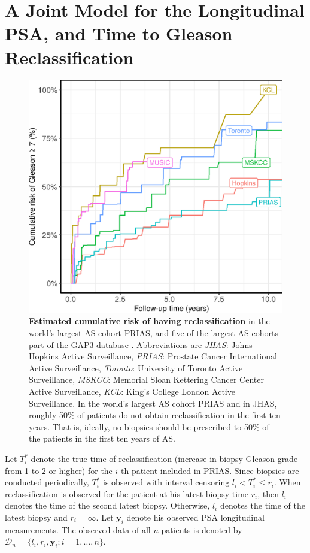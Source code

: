 \section{A Joint Model for the Longitudinal PSA, and Time to Gleason Reclassification}
\label{sec:jm_framework}

\begin{figure}
\centerline{\includegraphics[width=\columnwidth]{images/npmle_plot.eps}}
\caption{\textbf{Estimated cumulative risk of having reclassification} in the world's largest AS cohort PRIAS, and five of the largest AS cohorts part of the GAP3 database \citep{gap3_2018}. Abbreviations are \textit{JHAS}: Johns Hopkins Active Surveillance, \textit{PRIAS}: Prostate Cancer International Active Surveillance, \textit{Toronto}: University of Toronto Active Surveillance, \textit{MSKCC}: Memorial Sloan Kettering Cancer Center Active Surveillance, \textit{KCL}: King's College London Active Surveillance. In the world's largest AS cohort PRIAS and in JHAS, roughly 50\% of patients do not obtain reclassification in the first ten years. That is, ideally, no biopsies should be prescribed to 50\% of the patients in the first ten years of AS.}
\label{fig:npmle_plot}
\end{figure}

Let $T_i^*$ denote the true time of reclassification (increase in biopsy Gleason grade from 1 to 2 or higher) for the ${i\mbox{-th}}$ patient included in PRIAS. Since biopsies are conducted periodically, $T_i^*$ is observed with interval censoring ${l_i < T_i^* \leq r_i}$. When reclassification is observed for the patient at his latest biopsy time $r_i$, then $l_i$ denotes the time of the second latest biopsy. Otherwise, $l_i$ denotes the time of the latest biopsy and ${r_i=\infty}$. Let $\boldsymbol{y}_{i}$ denote his observed PSA longitudinal measurements. The observed data of all $n$ patients is denoted by ${\mathcal{D}_n = \{l_i, r_i, \boldsymbol{y}_{i}; i = 1, \ldots, n\}}$.

